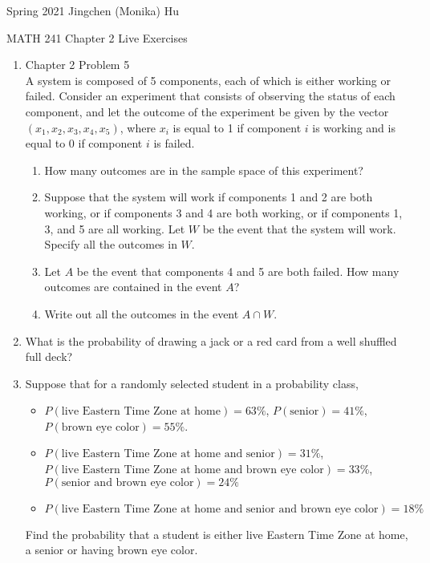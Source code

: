 \documentclass[11pt]{article}
\begin{document}
\enlargethispage{\baselineskip}

Spring 2021 \hfill Jingchen (Monika) Hu\\

\begin{center}
{\huge MATH 241 Chapter 2 Live Exercises}	\\
\end{center}
\vspace{0.5cm}

\begin{enumerate}


    \item  Chapter 2 Problem 5 \\
    A system is composed of 5 components, each of which is either working or failed. Consider an experiment that consists of observing the status of each component, and let the outcome of the experiment be given by the vector $(x_1, x_2, x_3, x_4, x_5)$, where $x_i$ is equal to 1 if component $i$ is working and is equal to 0 if component $i$ is failed.
    
   	\begin{enumerate}
	\item How many outcomes are in the sample space of this experiment?
	\item Suppose that the system will work if components 1 and 2 are both working, or if components 3 and 4 are both working, or if components 1, 3, and 5 are all working. Let $W$ be the event that the system will work. Specify all the outcomes in $W$.
	\item Let $A$ be the event that components 4 and 5 are both failed. How many outcomes are contained in the event $A$?
	\item Write out all the outcomes in the event $A \cap W$.
	\end{enumerate}
  
    \item What is the probability of drawing a jack or a red card from a well shuffled full deck?
    
    \item Suppose that for a randomly selected student in a probability class,
\begin{itemize}
\item $P(\text{live Eastern Time Zone at home}) = 63\%$, $P(\text{senior}) = 41\%$, $P(\text{brown eye color}) = 55\%$.
\item $P(\text{live Eastern Time Zone at home and senior}) = 31\%$, \\
$P(\text{live Eastern Time Zone at home and brown eye color}) = 33\%$, \\
$P(\text{senior and brown eye color}) = 24\%$
\item $P(\text{live Eastern Time Zone at home and senior and brown eye color}) = 18\%$
\end{itemize}
Find the probability that a student is either live Eastern Time Zone at home, a senior or having brown eye color.


\end{enumerate}
\end{document}
